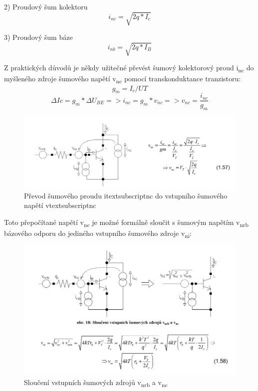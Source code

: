 2) Proudový šum kolektoru
\begin{equation}
i_{nc}=\sqrt{2q*I_{c}}
\end{equation}

3) Proudový šum báze
\begin{equation}
i_{nb}=\sqrt{2q*I_{B}}
\end{equation}

Z praktických důvodů je někdy užitečné převést šumový kolektorový proud i\textsubscript{nc} do myšleného zdroje šumového napětí v\textsubscript{nc} pomocí transkonduktance tranzistoru:
\begin{equation}
g_{m} = I_{c}/U{T}
\end{equation}
\begin{equation}
\Delta I{c} = g_{m}*\Delta U_{BE} => i_{nc} = g_{m} * v_{nc} => v_{nc}=\frac{i_{nc}}{g_{m}}
\end{equation}

\begin{figure}[h]
   \begin{center}
     \includegraphics[scale=0.5]{images/prevodBJT.png}
   \end{center}
   \caption{Převod šumového proudu itextsubscript{nc} do vstupního šumového napětí vtextsubscript{nc}}
\end{figure}

Toto přepočítané napětí v\textsubscript{nc} je možné formálně sloučit s šumovým napětím v\textsubscript{nrb} bázového odporu do jediného vstupního šumového zdroje v\textsubscript{ni}:

\begin{figure}[h]
   \begin{center}
     \includegraphics[scale=0.5]{images/slouceniBJT.png}
   \end{center}
   \caption{Sloučení vstupních šumových zdrojů v\textsubscript{nrb} a v\textsubscript{nc}}
\end{figure}

